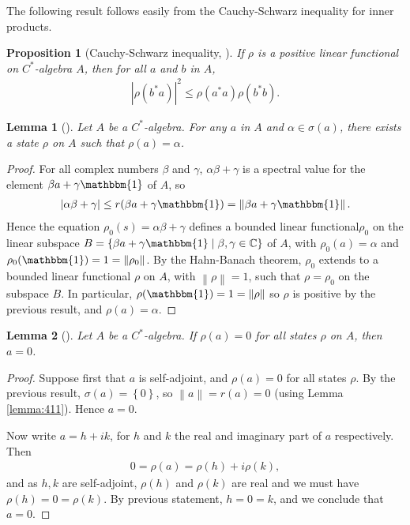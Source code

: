 \documentclass[11pt,a4paper]{report}
\theoremstyle{plain}
\newtheorem{lemma}{Lemma}
\newtheorem*{prop*}{Proposition}
\theoremstyle{definition}
\newcommand{\1}{\mathbbm{1}}
\newcommand{\C}{\mathbb{C}}
\newcommand{\spec}[1]{\sigma(#1)}
\begin{document}
The following result follows easily from the Cauchy-Schwarz inequality for inner 
products.
\begin{prop*}[Cauchy-Schwarz inequality, {\cite[4.3.1]{kadison83}}]
	If $\rho$ is a positive linear functional on $C^\ast$-algebra $A$, then for all 
	$a$ and $b$ in $A$,
	\begin{align*}
		|\rho(b^\ast a)|^2 \leq \rho(a^\ast a)\rho(b^\ast b).
	\end{align*}
\end{prop*}


\begin{lemma}[{\cite[4.3.3]{kadison83}}]\label{lemma:433}
	Let $A$ be a $C^\ast$-algebra. For any $a$ in $A$ and $\alpha\in\spec{a}$, there 
	exists a state $\rho$ on $A$ such that $\rho(a)=\alpha$.
\end{lemma}
\begin{proof}
	For all complex numbers $\beta$ and $\gamma$, $\alpha\beta+\gamma$ is a spectral 
	value for the element $\beta a+\gamma\1$ of $A$, so 
	\begin{align*}
		|\alpha\beta+\gamma|\leq r(\beta a+\gamma\1)=\left\|\beta a+\gamma\1\right\|.
	\end{align*} 
	Hence the equation $\rho_0(s)=\alpha\beta+\gamma$ defines a bounded linear 
	functional$\rho_0$ on the linear subspace $B= \left\{\beta a+\gamma\1 \mid 
	\beta,\gamma\in\C\right\}$ of $A$, with $\rho_0(a) =\alpha$ and 
	$\rho_0(\1)=1=\left\|\rho_0\right\|$. By the Hahn-Banach theorem, $\rho_0$ 
	extends to a bounded linear functional $\rho$ on $A$, with 
	$\left\|\rho\right\|=1$, such that $\rho=\rho_0$ on the subspace $B$. In 
	particular, $\rho(\1)=1=\left\|\rho\right\|$ so $\rho$ is positive by the 
	previous result, and $\rho(a)=\alpha$.
\end{proof}

\begin{lemma}[{\cite[4.3.4,(i)]{kadison83}}]\label{lemma:state1}
	Let $A$ be a $C^\ast$-algebra. If $\rho(a)=0$ for all states $\rho$ on $A$, 
	then $a=0$.
\end{lemma}
\begin{proof}
	Suppose first that $a$ is self-adjoint, and $\rho(a)=0$ for all states $\rho$. 
	By the previous result, $\spec{a}=\left\{0\right\}$, so 
	$\left\|a\right\|=r(a)=0$ (using Lemma \ref{lemma:411}). Hence $a=0$.

	Now write $a=h+ik$, for $h$ and $k$ the real and imaginary part of $a$ 
	respectively. Then
	\begin{align*}
		0=\rho(a)=\rho(h)+i\rho(k),
	\end{align*}
	and as $h,k$ are self-adjoint, $\rho(h)$ and $\rho(k)$ are real and we must have 
	$\rho(h)=0=\rho(k)$. By previous statement, $h=0=k$, and we conclude that $a=0$.
\end{proof}
\end{document}
